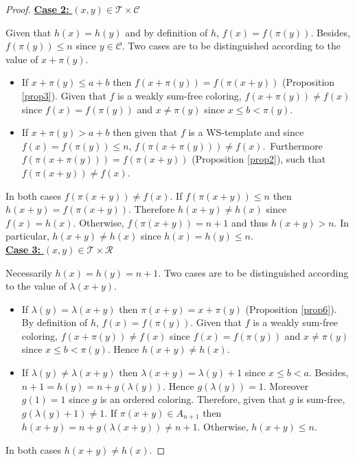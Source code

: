 \documentclass{article}
\newtheorem{computational theorem}[definition]{Computational Theorem}
\begin{document}
\begin{proof}
\noindent \underline{\textbf{Case 2:} \((x,y) \in \mathcal{T} \times \mathcal{C}\)}
\par
Given that \(h(x) = h(y)\) and by definition of \(h\), \(f(x) = f(\pi(y))\). Besides, \(f(\pi(y)) \leqslant n\) since
\(y \in \mathcal{C}\). Two cases are to be distinguished according to the value of \(x + \pi(y)\).
\begin{itemize}
\item \begin{sloppypar}
	If \(x + \pi(y) \leqslant a + b\) then \(f(x + \pi(y)) = f(\pi(x + y))\) (Proposition \ref{prop3}). Given that \(f\) is
	a weakly sum-free coloring, \(f(x+\pi(y)) \neq f(x)\) since \(f(x)=f(\pi(y))\) and \(x \neq \pi(y)\) since
	\({x \leqslant b < \pi(y)}\).
	\end{sloppypar}
\item \begin{sloppypar}
	If \(x+\pi(y)> a+b\) then given that \(f\) is a WS-template and since \({f(x) = f(\pi(y)) \leqslant n}\),
	\({f(\pi(x+\pi(y))) \neq f(x)}\).~Furthermore \({f(\pi(x+\pi(y))) = f(\pi(x+y))}\) (Proposition \ref{prop2}), such that
	\({f(\pi(x+ y)) \neq f(x)}\).
	\end{sloppypar}
\end{itemize}
\par
In both cases \(f(\pi(x+y)) \neq f(x)\). If  \(f(\pi(x+y)) \leqslant n\) then \(h(x+y) = f(\pi(x+y))\). Therefore
\(h(x+y) \neq h(x)\) since \(f(x) = h(x)\). Otherwise, \(f(\pi(x+y)) = n + 1\) and thus \(h(x+y) > n\). In particular,
\(h(x + y) \neq h(x)\) since \(h(x) = h(y) \leqslant n\). \\

\noindent \underline{\textbf{Case 3:} \((x,y) \in \mathcal{T} \times \mathcal{R}\)}
\par
Necessarily \(h(x) = h(y) = n + 1\). Two cases are to be distinguished according to the value of \(\lambda(x+y)\).
\begin{itemize}
\item If \(\lambda(y)=\lambda(x+y)\) then \(\pi(x + y) = x + \pi(y)\) (Proposition \ref{prop6}). By definition of
	\(h\), \(f(x) = f(\pi(y))\). Given that \(f\) is a weakly sum-free coloring, \(f(x + \pi(y)) \neq f(x)\) since
	\(f(x) = f(\pi(y))\) and \(x \neq \pi(y)\) since \({x \leqslant b < \pi(y)}\). Hence \(h(x + y) \neq h(x)\).
\item If \(\lambda(y) \neq \lambda(x + y)\) then \(\lambda(x + y) = \lambda(y) + 1\) since \(x \leqslant b < a\).
	Besides, \(n + 1 = h(y) = n +  g(\lambda(y))\). Hence \(g(\lambda(y)) = 1\). Moreover \(g(1) = 1\) since \(g\)
	is an ordered coloring. Therefore, given that \(g\) is sum-free, \(g(\lambda(y) + 1) \neq 1\). If \(\pi(x + y) \in
	A_{n + 1}\) then \(h(x + y) = n + g(\lambda(x + y)) \neq n + 1\). Otherwise, \(h(x + y) \leqslant n\).
\end{itemize}
\par
In both cases \(h(x + y) \neq h(x)\).


\end{proof}
\end{document}
